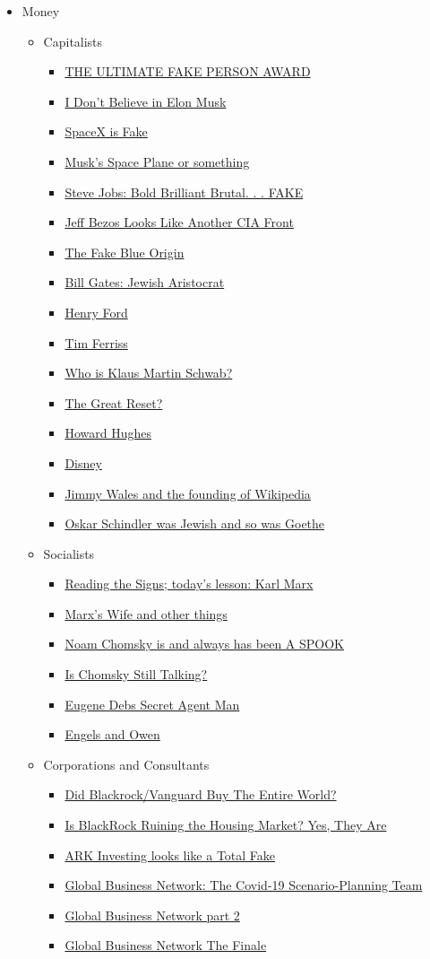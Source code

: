 \documentclass{article}
\newcommand{\insertmydocument}[2]{ %
  \item \href{http://www.mileswmathis.com/#2}{#1}
}
\begin{document}
\begin{itemize}
  \item Money
  \begin{itemize}

    \item Capitalists
    \begin{itemize}

      \insertmydocument{THE ULTIMATE FAKE PERSON AWARD}{zuck.pdf}
      \insertmydocument{I Don't Believe in Elon Musk}{musk.pdf}
      \insertmydocument{SpaceX is Fake}{spacex.pdf}
      \insertmydocument{Musk's Space Plane or something}{spaceballs.pdf}
      \insertmydocument{Steve Jobs: Bold Brilliant Brutal. . . FAKE}{jobs.pdf}
      \insertmydocument{Jeff Bezos Looks Like Another CIA Front}{bezos.pdf}
      \insertmydocument{The Fake Blue Origin}{bezos2.pdf}
      \insertmydocument{Bill Gates: Jewish Aristocrat}{gates.pdf}
      \insertmydocument{Henry Ford}{ford.pdf}
      \insertmydocument{Tim Ferriss}{ferriss.pdf}
      \insertmydocument{Who is Klaus Martin Schwab?}{schwab.pdf}
      \insertmydocument{The Great Reset?}{reset.pdf}
      \insertmydocument{Howard Hughes}{hughes3.pdf}
      \insertmydocument{Disney}{disney.pdf}
      \insertmydocument{Jimmy Wales and the founding of Wikipedia}{wiki3.pdf}
      \insertmydocument{Oskar Schindler was Jewish and so was Goethe}{goth.pdf}

    \end{itemize}

    \item Socialists
    \begin{itemize}

      \insertmydocument{Reading the Signs; today's lesson: Karl Marx}{marx.pdf}
      \insertmydocument{Marx's Wife and other things}{jenny.pdf}
      \insertmydocument{Noam Chomsky is and always has been A SPOOK}{chom.pdf}
      \insertmydocument{Is Chomsky Still Talking?}{chom3.pdf}
      \insertmydocument{Eugene Debs Secret Agent Man}{debs.pdf}
      \insertmydocument{Engels and Owen}{engels.pdf}

    \end{itemize}

    \item Corporations and Consultants
    \begin{itemize}

      \insertmydocument{Did Blackrock/Vanguard Buy The Entire World?}{black.pdf}
      \insertmydocument{Is BlackRock Ruining the Housing Market? Yes, They Are}{housing.pdf}
      \insertmydocument{ARK Investing looks like a Total Fake}{cathie.pdf}
      \insertmydocument{Global Business Network: The Covid-19 Scenario-Planning Team}{gbn.pdf}
      \insertmydocument{Global Business Network part 2}{gbn2.pdf}
      \insertmydocument{Global Business Network The Finale}{gbn3.pdf}
    \end{itemize}


\end{itemize}
\end{itemize}
\end{document}
